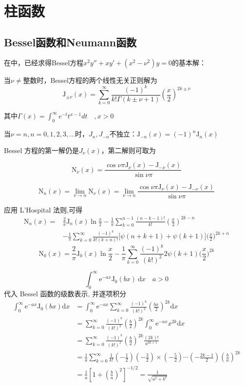 \newpage
\section{柱函数}
\label{cylindrical}
\subsection{Bessel函数和Neumann函数}
在中，已经求得Bessel方程$x^2y''+xy'+(x^2-\nu^2)y=0$的基本解：

当$\nu\ne$整数时，Bessel方程的两个线性无关正则解为
$$
\boxed{\mathrm{J}_{\pm\nu}(x)=\sum_{k=0}^{\infty}\frac{(-1)^{k}}{k!\Gamma\left(k\pm\nu+1\right)}\left(\frac{x}{2}\right)^{2k\pm\nu}}
$$

其中$\Gamma(x)=\int_0^\infty e^{-t}t^{x-1}dt\quad,x>0$

当$\nu=n,n=0,1,2,3,...$时，$J_n,J_{-n}$不独立：$\mathrm{J}_{-n}(x)=(-1)^n\mathrm{J}_n(x)$

Bessel 方程的第一解仍是$J_\nu(x)$，第二解则可取为

\begin{dfn}[Neumann函数]
    $$\boxed{\mathrm{N}_\nu(x)=\frac{\cos\nu\pi\mathrm{J}_\nu(x)-\mathrm{J}_{-\nu}(x)}{\sin\nu\pi}}$$
\end{dfn}


$$\mathrm{N}_n(x)=\lim_{\nu\to n}\mathrm{N}_\nu(x)=\lim_{\nu\to n}\frac{\cos\nu\pi\mathrm{J}_\nu(x)-\mathrm{J}_{-\nu}(x)}{\sin\nu\pi}$$

应用 L'Hospital 法则,可得
$$\begin{aligned}
\mathrm{N}_n(x)=&\frac2\pi\mathrm{J}_n(x)\ln\frac x2-\frac1\pi\sum_{k=0}^{n-1}\frac{(n-k-1)!}{k!}\left(\frac x2\right)^{2k-n}\\
&-\frac1\pi\sum_{k=0}^\infty\frac{(-1)^k}{k!(k+n)!}\Big[\psi(n+k+1)+\psi(k+1)\Big]\Big(\frac x2\Big)^{2k+n}
\end{aligned}$$
$$\mathrm{N}_0(x)=\frac2\pi\mathrm{J}_0(x)\ln\frac x2
-\frac1\pi\sum_{k=0}^\infty\frac{(-1)^k}{(k!)^2}2\psi(k+1)\Big(\frac x2\Big)^{2k}$$

\begin{ex}
    $$\int_0^\infty\mathrm{e}^{-ax}\mathrm{J}_0(bx)\mathrm{~d}x\quad a>0$$
    代入 Bessel 函数的级数表示, 并逐项积分
    $$\begin{aligned}
        \int_0^\infty\mathrm{e}^{-ax}\mathrm{J}_0(bx) \mathrm{d}x& 
        =\int_0^\infty\mathrm{e}^{-ax}\sum_{k=0}^\infty\frac{(-1)^k}{(k!)^2}\left(\frac{bx}2\right)^{2k}\mathrm{d}x \\
        &=\sum_{k=0}^\infty\frac{(-1)^k}{(k!)^2}\left(\frac b2\right)^{2k} \int_0^\infty\mathrm{e}^{-ax}x^{2k} \mathrm{d}x \\
        &=\sum_{k=0}^\infty\frac{(-1)^k}{(k!)^2}\left(\frac b2\right)^{2k}\frac{(2k)!}{a^{2k+1}} \\
        &=\frac1a\sum_{k=0}^\infty\frac1{k!}\left(-\frac12\right)\left(-\frac32\right)\times\left(-\frac52\right)\cdots\left(-\frac{2k-1}2\right)\left(\frac ba\right)^{2k} \\
        &=\frac1a\left[1+\left(\frac ba\right)^2\right]^{-1/2}=\frac1{\sqrt{a^2+b^2}}
        \end{aligned}$$
\end{ex}

